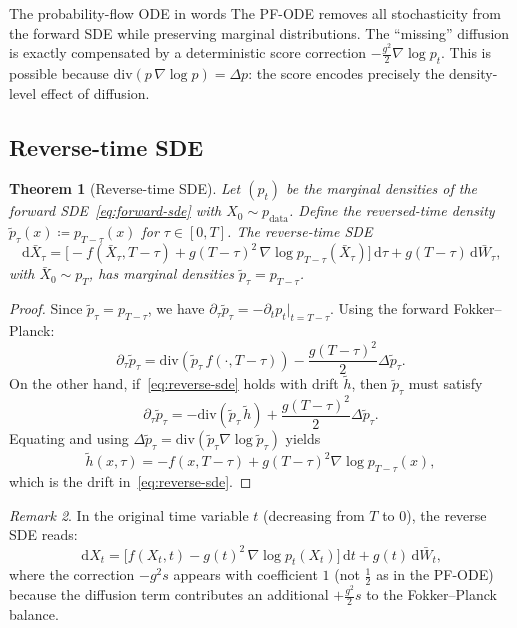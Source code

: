 \documentclass[11pt]{article}
\newcommand{\grad}{\nabla}
\newcommand{\diver}{\mathrm{div}}
\newcommand{\dd}{\,\mathrm{d}}
\newtheorem{theorem}{Theorem}[section]
\theoremstyle{definition}
\theoremstyle{remark}
\newtheorem{remark}[theorem]{Remark}
\begin{document}
\begin{insightbox}{The probability-flow ODE in words}
The PF-ODE removes all stochasticity from the forward SDE while preserving marginal distributions.
The ``missing'' diffusion is exactly compensated by a deterministic score correction $-\frac{g^2}{2}\grad\log p_t$.
This is possible because $\diver(p\,\grad\log p) = \Delta p$: the score encodes precisely the density-level effect of diffusion.
\end{insightbox}

\subsection{Reverse-time SDE}\label{subsec:reverse-sde}

\begin{theorem}[Reverse-time SDE]\label{thm:reverse-sde}
Let $(p_t)$ be the marginal densities of the forward SDE~\eqref{eq:forward-sde} with $X_0 \sim p_{\mathrm{data}}$.
Define the reversed-time density $\tilde{p}_\tau(x) \coloneqq p_{T-\tau}(x)$ for $\tau\in[0,T]$.
The reverse-time SDE
\begin{equation}\label{eq:reverse-sde}
\dd \bar{X}_\tau = \Big[-f(\bar{X}_\tau, T-\tau) + g(T-\tau)^2\,\grad\log p_{T-\tau}(\bar{X}_\tau)\Big]\dd\tau + g(T-\tau)\dd\bar{W}_\tau,
\end{equation}
with $\bar{X}_0 \sim p_T$, has marginal densities $\tilde{p}_\tau = p_{T-\tau}$.
\end{theorem}

\begin{proof}
Since $\tilde{p}_\tau = p_{T-\tau}$, we have $\partial_\tau \tilde{p}_\tau = -\partial_t p_t\big|_{t=T-\tau}$.
Using the forward Fokker--Planck:
\[
\partial_\tau \tilde{p}_\tau = \diver(\tilde{p}_\tau\,f(\cdot,T-\tau)) - \frac{g(T-\tau)^2}{2}\Delta\tilde{p}_\tau.
\]
On the other hand, if~\eqref{eq:reverse-sde} holds with drift $\tilde{h}$, then $\tilde{p}_\tau$ must satisfy
\[
\partial_\tau \tilde{p}_\tau = -\diver(\tilde{p}_\tau\,\tilde{h}) + \frac{g(T-\tau)^2}{2}\Delta\tilde{p}_\tau.
\]
Equating and using $\Delta\tilde{p}_\tau = \diver(\tilde{p}_\tau\grad\log\tilde{p}_\tau)$ yields
\[
\tilde{h}(x,\tau) = -f(x,T-\tau) + g(T-\tau)^2\grad\log p_{T-\tau}(x),
\]
which is the drift in~\eqref{eq:reverse-sde}.
\end{proof}

\begin{remark}
In the original time variable $t$ (decreasing from $T$ to $0$), the reverse SDE reads:
\[
\dd X_t = \big[f(X_t,t) - g(t)^2\,\grad\log p_t(X_t)\big]\dd t + g(t)\dd\bar{W}_t,
\]
where the correction $-g^2 s$ appears with coefficient $1$ (not $\frac{1}{2}$ as in the PF-ODE) because the diffusion term contributes an additional $+\frac{g^2}{2}s$ to the Fokker--Planck balance.
\end{remark}
\end{document}
